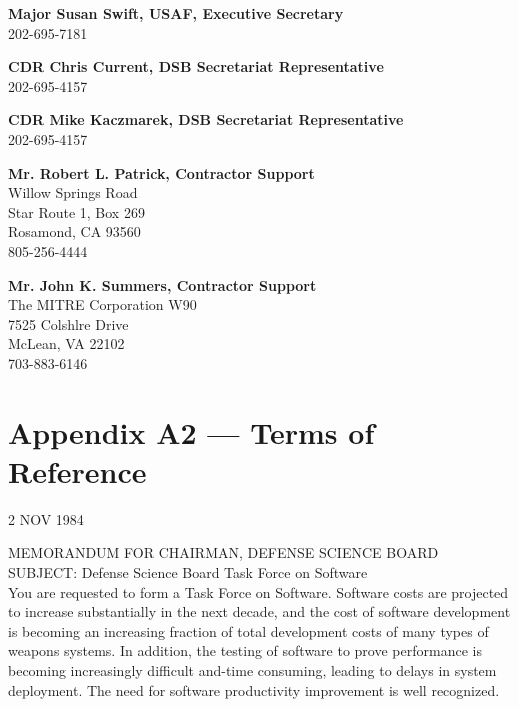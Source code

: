 \documentclass[12pt]{article}
\begin{document}
\textbf{Major Susan Swift, USAF, Executive Secretary}\\
\hspace*{2cm}202-695-7181

\textbf{CDR Chris Current, DSB Secretariat Representative}\\
\hspace*{2cm}202-695-4157

\textbf{CDR Mike Kaczmarek, DSB Secretariat Representative}\\
\hspace*{2cm}202-695-4157

\textbf{Mr. Robert L. Patrick, Contractor Support}\\
\hspace*{2cm}Willow Springs Road\\
\hspace*{2cm}Star Route 1, Box 269\\
\hspace*{2cm}Rosamond, CA 93560\\
\hspace*{2cm}805-256-4444

\medskip

\textbf{Mr. John K. Summers, Contractor Support}\\
\hspace*{2cm}The MITRE Corporation W90\\
\hspace*{2cm}7525 Colshlre Drive\\
\hspace*{2cm}McLean, VA 22102\\
\hspace*{2cm}703-883-6146

\newpage

\section*{Appendix A2 — Terms of Reference}
\begin{flushright}
    2 NOV 1984
\end{flushright}

\noindent
MEMORANDUM FOR CHAIRMAN, DEFENSE SCIENCE BOARD\\

\noindent
SUBJECT: Defense Science Board Task Force on Software\\

You are requested to form a Task Force on Software.  Software costs are
projected to increase substantially in the next decade, and the cost of
software development is becoming an increasing fraction of total development
costs of many types of weapons systems. In addition, the testing of software to
prove performance is becoming increasingly difficult and-time consuming,
leading to delays in system deployment. The need for software productivity
improvement is well recognized.
\end{document}
